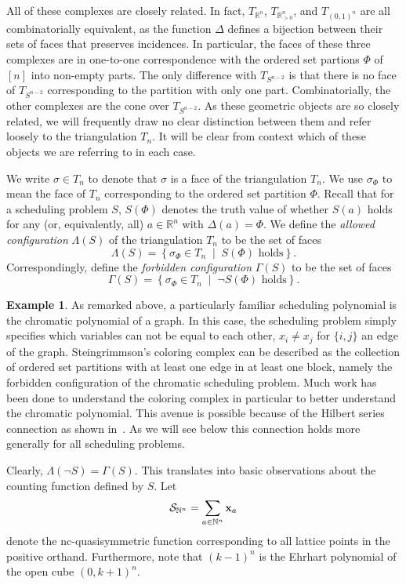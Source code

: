 \documentclass[12pt,reqno]{amsart}
\numberwithin{definition}{section}
\theoremstyle{definition}
\newtheorem{example}[definition]{Example}
\newcommand{\RR}{\mathbb{R}}
\newcommand{\NN}{\mathbb{N}}
\newcommand{\SSS}{\mathcal{S}}
\newcommand{\mset}[2]{ \left\{ #1 \; \middle| \; #2 \right\}}
\newcommand{\T}{T} %
\newcommand{\Tn}{T_n} %
\newcommand{\TRn}{\T_{\RR^n}} %
\newcommand{\TS}{\T_{S^{n-2}}} %
\newcommand{\TP}{\T_{\RR^n_{> 0}}} %
\newcommand{\TC}{\T_{(0,1)^n}} %
\newcommand{\allow}{\Lambda} %
\newcommand{\forb}{\Gamma} %
\begin{document}
All of these complexes are closely related. In fact, $\TRn$, $\TP$, and $\TC$ are all combinatorially equivalent, as the function $\Delta$ defines a bijection between their sets of faces that preserves incidences. In particular, the faces of these three complexes are in one-to-one correspondence with the ordered set partions $\Phi$ of $[n]$ into non-empty parts. The only difference with $\TS$ is that there is no face of $\TS$ corresponding to the partition with only one part. Combinatorially, the other complexes are the cone over $\TS$. As these geometric objects are so closely related, we will frequently draw no clear distinction between them and refer loosely to the triangulation $\Tn$. It will be clear from context which of these objects we are referring to in each case.

We write $\sigma\in\Tn$ to denote that $\sigma$ is a face of the triangulation $\Tn$. We use $\sigma_\Phi$ to mean the face of $\Tn$ corresponding to the ordered set partition $\Phi$.  Recall that for a scheduling problem $S$, $S(\Phi)$ denotes the truth value of whether $S(a)$ holds for any (or, equivalently, all) $a\in\RR^n$ with $\Delta(a)=\Phi$. We define the \emph{allowed configuration} $\allow(S)$ of the triangulation $\Tn$ to be the set of faces 
\[
  \allow(S) = \mset{\sigma_\Phi \in \Tn}{S(\Phi) \textrm{ holds}}.
\]
Correspondingly, define the \emph{forbidden configuration} $\forb(S)$ to be the set of faces
\[
  \forb(S) = \mset{\sigma_\Phi \in \Tn}{\neg S(\Phi) \textrm{ holds}}.
\]



\begin{example} As remarked above, a particularly familiar scheduling polynomial is the chromatic polynomial of a graph.  In this case, the scheduling problem simply specifies which variables can not be equal to each other, $x_i \neq x_j$ for $\{i,j\}$ an edge of the graph.   Steingrimmson's coloring complex can be described as
the collection of ordered set partitions with at least one edge in at least one block, namely 
the forbidden configuration of the chromatic scheduling problem.  
Much work has been done to understand the coloring complex in particular to better understand the chromatic polynomial.  This avenue is possible because of the Hilbert series connection as shown in~\cite{Ein}.  As we will see below this connection holds more generally for all scheduling problems.
\end{example}

Clearly, $\allow(\neg S)=\forb(S)$. This translates into basic observations about the counting function defined by $S$. Let 
\[
  \SSS_{\NN^n} = \sum_{a\in\NN^n} {\bf x}_a
\]
denote the nc-quasisymmetric function corresponding to all lattice points in the positive orthand. Furthermore, note that $(k-1)^n$ is the Ehrhart polynomial of the open cube $(0,k+1)^n$. 
\end{document}

